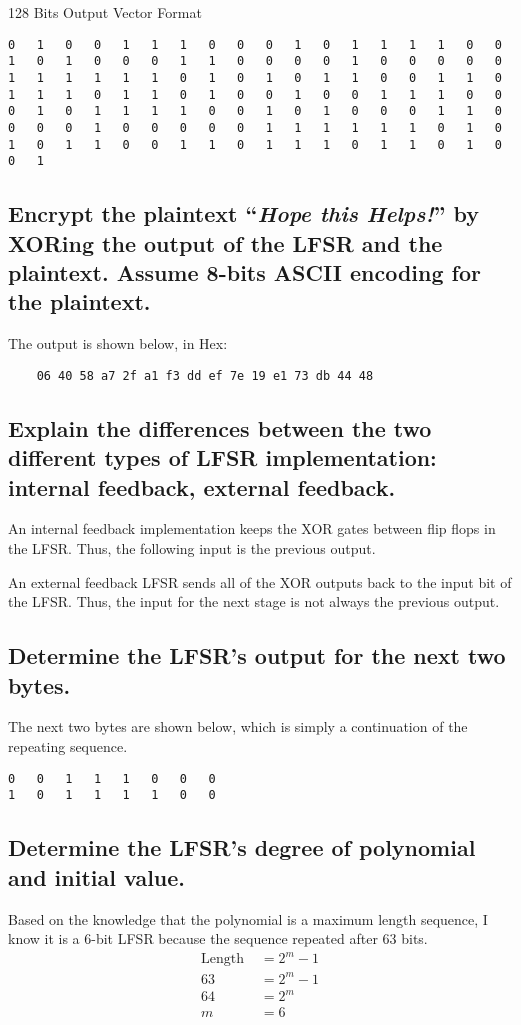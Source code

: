 \documentclass{article}
\begin{document}
\begin{table}[H]
   \centering
   \caption{128 Bits Output Vector Format}
   \begin{verbatim}
0	1	0	0	1	1	1	0	0	0	1	0	1	1	1	1	0	0	1	0	1	0	0	0	1	1	0	0	0	0	1	0	0	0	0	0	1	1	1	1	1	1	0	1	0	1	0	1	1	0	0	1	1	0	1	1	1	0	1	1	0	1	0	0	1	0	0	1	1	1	0	0	0	1	0	1	1	1	1	0	0	1	0	1	0	0	0	1	1	0	0	0	0	1	0	0	0	0	0	1	1	1	1	1	1	0	1	0	1	0	1	1	0	0	1	1	0	1	1	1	0	1	1	0	1	0	0	1
   \end{verbatim} 
\end{table}
\subsection*{Encrypt the plaintext ``\textit{Hope this Helps!}'' by XORing the output of the LFSR and the plaintext. Assume 8-bits ASCII encoding for the plaintext.}
The output is shown below, in Hex:

	\begin{verbatim}
	06 40 58 a7 2f a1 f3 dd ef 7e 19 e1 73 db 44 48
	\end{verbatim}
\newpage
\subsection*{Explain the differences between the two different types of LFSR implementation: internal feedback, external feedback.}

An internal feedback implementation keeps the XOR gates between flip flops in the LFSR.  
Thus, the following input is the previous output.

An external feedback LFSR sends all of the XOR outputs back to the input bit of the LFSR.
Thus, the input for the next stage is not always the previous output.

\subsection*{Determine the LFSR's output for the next two bytes.}
The next two bytes are shown below, which is simply a continuation of the repeating sequence.

\begin{verbatim}
0	0	1	1	1	0	0	0
1	0	1	1	1	1	0	0
\end{verbatim}

\subsection*{Determine the LFSR's degree of polynomial and initial value.}
Based on the knowledge that the polynomial is a maximum length sequence, I know it is a 6-bit LFSR because the sequence repeated after 63 bits.
\begin{align*}
\text{Length } &= 2^m - 1 \\
		63 		&= 2^m - 1 \\
		64		&= 2^m \\
		m		&= 6
\end{align*}
\end{document}

